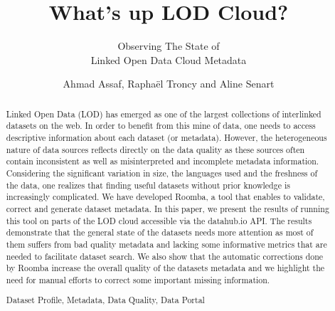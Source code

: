 \documentclass[runningheads,a4paper]{../../Util/LaTEX/llncs}
\newcommand{\keywords}[1]{\par\addvspace\baselineskip
\noindent\keywordname\enspace\ignorespaces#1}
\begin{document}
\title{What's up LOD Cloud?}
\subtitle{Observing The State of\\Linked Open Data Cloud Metadata}

\author{Ahmad Assaf, Rapha\"{e}l Troncy and Aline Senart}



\maketitle


\begin{abstract}
Linked Open Data (LOD) has emerged as one of the largest collections of interlinked datasets on the web. In order to benefit from this mine of data, one needs to access descriptive information about each dataset (or metadata). However, the heterogeneous nature of data sources reflects directly on the data quality as these sources often contain inconsistent as well as misinterpreted and incomplete metadata information. Considering the significant variation in size, the languages used and the freshness of the data, one realizes that finding useful datasets without prior knowledge is increasingly complicated. We have developed Roomba, a tool that enables to validate, correct and generate dataset metadata. In this paper, we present the results of running this tool on parts of the LOD cloud accessible via the datahub.io API. The results demonstrate that the general state of the datasets needs more attention as most of them suffers from bad quality metadata and lacking some informative metrics that are needed to facilitate dataset search. We also show that the automatic corrections done by Roomba increase the overall quality of the datasets metadata and we highlight the need for manual efforts to correct some important missing information.

\keywords{Dataset Profile, Metadata, Data Quality, Data Portal}
\end{abstract}

\end{document}

